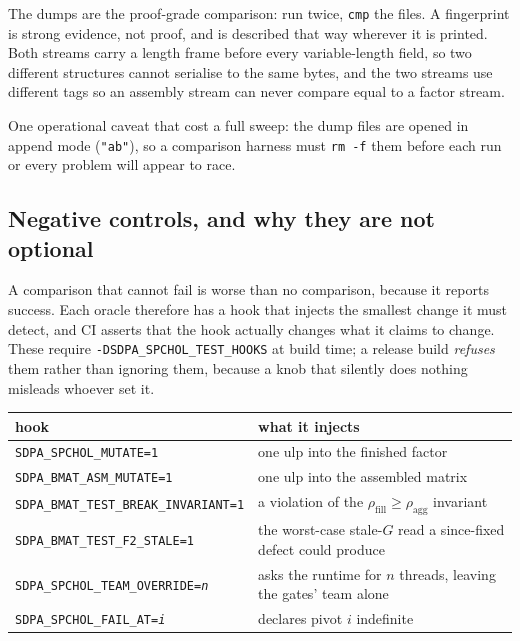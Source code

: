 \documentclass[11pt]{article}
\newcommand{\aggr}{\rho_{\mathrm{agg}}}
\newcommand{\rfill}{\rho_{\mathrm{fill}}}
\newcommand{\code}[1]{\texttt{#1}}
\begin{document}
The dumps are the proof-grade comparison: run twice, \code{cmp} the files. A fingerprint is strong
evidence, not proof, and is described that way wherever it is printed. Both streams carry a length
frame before every variable-length field, so two different structures cannot serialise to the same
bytes, and the two streams use different tags so an assembly stream can never compare equal to a
factor stream.

One operational caveat that cost a full sweep: the dump files are opened in append mode
(\code{"ab"}), so a comparison harness must \code{rm -f} them before each run or every problem will
appear to race.

\subsection{Negative controls, and why they are not optional}

A comparison that cannot fail is worse than no comparison, because it reports success. Each oracle
therefore has a hook that injects the smallest change it must detect, and CI asserts that the hook
actually changes what it claims to change. These require \code{-DSDPA\_SPCHOL\_TEST\_HOOKS} at
build time; a release build \emph{refuses} them rather than ignoring them, because a knob that
silently does nothing misleads whoever set it.

\begin{center}\small
\begin{tabular}{@{}p{6.1cm}p{7.1cm}@{}}
\toprule
hook & what it injects \\
\midrule
\code{SDPA\_SPCHOL\_MUTATE=1}    & one ulp into the finished factor \\
\code{SDPA\_BMAT\_ASM\_MUTATE=1} & one ulp into the assembled matrix \\
\code{SDPA\_BMAT\_TEST\_BREAK\_INVARIANT=1} & a violation of the $\rfill \ge \aggr$ invariant \\
\code{SDPA\_BMAT\_TEST\_F2\_STALE=1} & the worst-case stale-$G$ read a since-fixed defect could produce \\
\code{SDPA\_SPCHOL\_TEAM\_OVERRIDE=\emph{n}} & asks the runtime for $n$ threads, leaving the gates' team alone \\
\code{SDPA\_SPCHOL\_FAIL\_AT=\emph{i}} & declares pivot $i$ indefinite \\
\bottomrule
\end{tabular}
\end{center}
\end{document}

